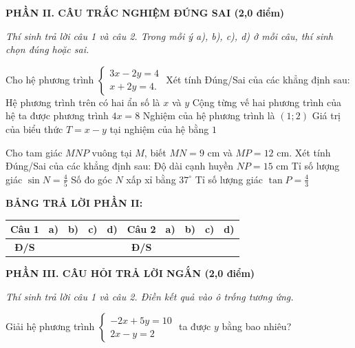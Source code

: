 \documentclass[12pt,a4paper]{article}
\begin{document}
\setcounter{ex}{0}
\noindent\textbf{\large PHẦN II. CÂU TRẮC NGHIỆM ĐÚNG SAI (2,0 điểm)}

\textit{Thí sinh trả lời câu 1 và câu 2. Trong mỗi ý a), b), c), d) ở mỗi câu, thí sinh chọn đúng hoặc sai.}

\vspace{1mm}
\begin{ex}
Cho hệ phương trình $\begin{cases} 3x - 2y = 4 \\ x + 2y = 4. \end{cases}$ Xét tính Đúng/Sai của các khẳng định sau:
\choiceTF
{\True Hệ phương trình trên có hai ẩn số là $x$ và $y$}
{\True Cộng từng vế hai phương trình của hệ ta được phương trình $4x = 8$}
{Nghiệm của hệ phương trình là $(1; 2)$}
{\True Giá trị của biểu thức $T = x - y$ tại nghiệm của hệ bằng $1$}
\end{ex}

\begin{ex}
Cho tam giác $MNP$ vuông tại $M$, biết $MN = 9\text{ cm}$ và $MP = 12\text{ cm}$. Xét tính Đúng/Sai của các khẳng định sau:
\choiceTF
{\True Độ dài cạnh huyền $NP = 15\text{ cm}$}
{\True Tỉ số lượng giác $\sin N = \frac{4}{5}$}
{Số đo góc $N$ xấp xỉ bằng $37^\circ$}
{Tỉ số lượng giác $\tan P = \frac{4}{3}$}
\end{ex}


\noindent\textbf{BẢNG TRẢ LỜI PHẦN II:}
\begin{center}
\begin{tabular}{|c|c|c|c|c||c|c|c|c|c|}
\hline
\textbf{Câu 1} & \textbf{a)} & \textbf{b)} & \textbf{c)} & \textbf{d)} & \textbf{Câu 2} & \textbf{a)} & \textbf{b)} & \textbf{c)} & \textbf{d)} \\
\hline
\textbf{Đ/S} & \rule{0pt}{0.6cm} & & & & \textbf{Đ/S} & & & & \\
\hline
\end{tabular}
\end{center}
\vspace{2mm}

\setcounter{ex}{0}
\noindent\textbf{\large PHẦN III. CÂU HỎI TRẢ LỜI NGẮN (2,0 điểm)}

\textit{Thí sinh trả lời câu 1 và câu 2. Điền kết quả vào ô trống tương ứng.}

\vspace{1mm}
\begin{ex}
Giải hệ phương trình $\begin{cases} -2x + 5y = 10 \\ 2x - y = 2 \end{cases}$ ta được $y$ bằng bao nhiêu? 
\end{ex}
\end{document}
